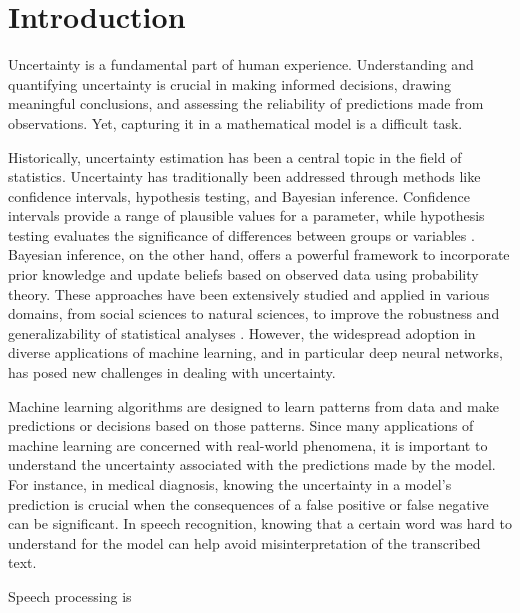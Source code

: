 
\chapter[introduction]{Introduction}\label{chp:introduction}


Uncertainty is a fundamental part of human experience. Understanding and quantifying uncertainty is crucial in making informed decisions, drawing meaningful conclusions, and assessing the reliability of predictions made from observations. Yet, capturing it in a mathematical model is a difficult task. 

Historically, uncertainty estimation has been a central topic in the field of statistics. Uncertainty has traditionally been addressed through methods like confidence intervals, hypothesis testing, and Bayesian inference. Confidence intervals provide a range of plausible values for a parameter, while hypothesis testing evaluates the significance of differences between groups or variables \cite{blitzstein_introduction_2019}. Bayesian inference, on the other hand, offers a powerful framework to incorporate prior knowledge and update beliefs based on observed data using probability theory. These approaches have been extensively studied and applied in various domains, from social sciences to natural sciences, to improve the robustness and generalizability of statistical analyses \cite{gelman_bayesian_2013}. However, the widespread adoption in diverse applications of machine learning, and in particular deep neural networks, has posed new challenges in dealing with uncertainty. 

Machine learning algorithms are designed to learn patterns from data and make predictions or decisions based on those patterns. Since many applications of machine learning are concerned with real-world phenomena, it is important to understand the uncertainty associated with the predictions made by the model. For instance, in medical diagnosis, knowing the uncertainty in a model's prediction is crucial when the consequences of a false positive or false negative can be significant. In speech recognition, knowing that a certain word was hard to understand for the model can help avoid misinterpretation of the transcribed text.

Speech processing is 



